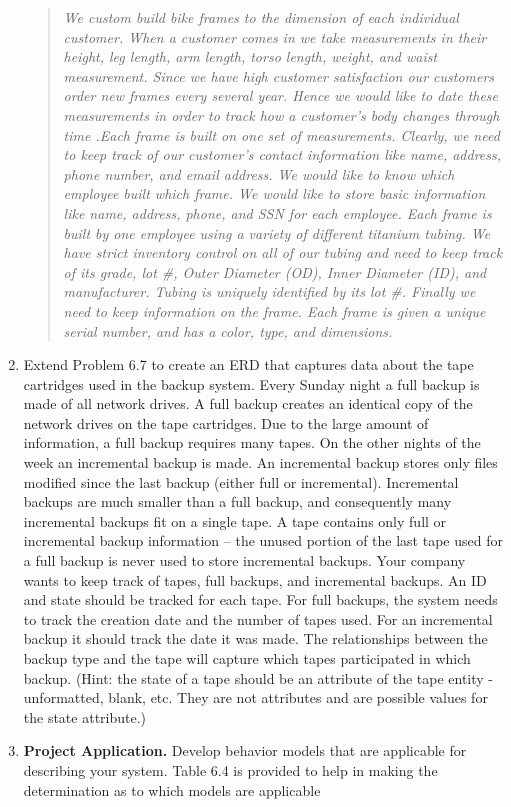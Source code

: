 \begin{enumerate}
\begin{quote}
\emph{We custom build bike frames to the dimension of each individual
customer. When a customer comes in we take measurements in their height,
leg length, arm length, torso length, weight, and waist measurement.
Since we have high customer satisfaction our customers order new frames
every several year. Hence we would like to date these measurements in
order to track how a customer's body changes through time .Each frame is
built on one set of measurements. Clearly, we need to keep track of our
customer's contact information like name, address, phone number, and
email address. We would like to know which employee built which frame.
We would like to store basic information like name, address, phone, and
SSN for each employee. Each frame is built by one employee using a
variety of different titanium tubing. We have strict inventory control
on all of our tubing and need to keep track of its grade, lot \#, Outer
Diameter (OD), Inner Diameter (ID), and manufacturer. Tubing is uniquely
identified by its lot \#. Finally we need to keep information on the
frame. Each frame is given a unique serial number, and has a color,
type, and dimensions.}
\end{quote}


\item
  Extend Problem 6.7 to create an ERD that captures data about the tape
  cartridges used in the backup system. Every Sunday night a full backup
  is made of all network drives. A full backup creates an identical copy
  of the network drives on the tape cartridges. Due to the large amount
  of information, a full backup requires many tapes. On the other nights
  of the week an incremental backup is made. An incremental backup
  stores only files modified since the last backup (either full or
  incremental). Incremental backups are much smaller than a full backup,
  and consequently many incremental backups fit on a single tape. A tape
  contains only full or incremental backup information -- the unused
  portion of the last tape used for a full backup is never used to store
  incremental backups. Your company wants to keep track of tapes, full
  backups, and incremental backups. An ID and state should be tracked
  for each tape. For full backups, the system needs to track the
  creation date and the number of tapes used. For an incremental backup
  it should track the date it was made. The relationships between the
  backup type and the tape will capture which tapes participated in
  which backup. (Hint: the state of a tape should be an attribute of the
  tape entity - unformatted, blank, etc. They are not attributes and are
  possible values for the state attribute.)

\item
  \textbf{Project Application.} Develop behavior models that are
  applicable for describing your system. Table 6.4 is provided to help
  in making the determination as to which models are applicable
\end{enumerate}
